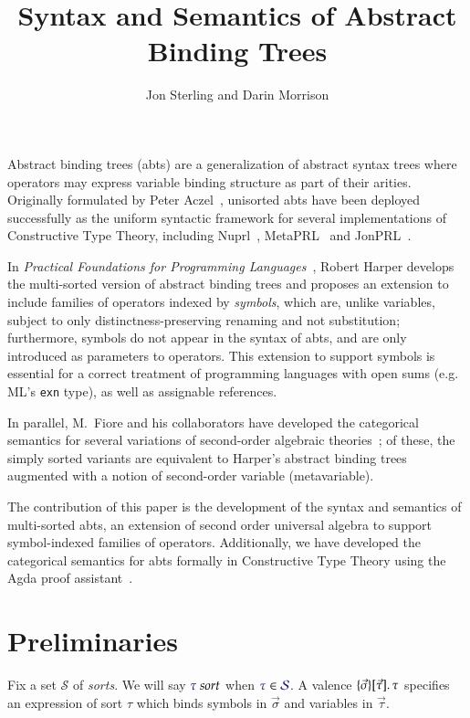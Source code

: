 \documentclass[11pt]{article}
\theoremstyle{definition}
\theoremstyle{remark}
\numberwithin{equation}{section}
\def\IModeColorName{MidnightBlue}
\newcommand\IMode[1]{{\color{\IModeColorName}{#1}}}
\newcommand\Member[2]{\IMode{#1}\in\IMode{#2}}
\newcommand\MkValence[3]{%
  \ifthenelse{\equal{#1}{}}{}{%
    \{#1\}%
  }%
  \ifthenelse{\equal{#2}{}}{}{%
    [#2]%
  }.\, #3%
}
\newcommand\IsSort[1]{\IMode{#1}\ \textit{sort}}
\newcommand\Sorts{\mathcal{S}}
\begin{document}
\title{Syntax and Semantics of Abstract Binding Trees}
\date{}
\author{Jon Sterling and Darin Morrison}
\maketitle

Abstract binding trees (abts) are a generalization of abstract syntax trees
where operators may express variable binding structure as part of their arities.
Originally formulated by Peter Aczel~\cite{aczel:1978}, unisorted abts have been
deployed successfully as the uniform syntactic framework for several
implementations of Constructive Type Theory, including
Nuprl~\cite{constable:1986}, MetaPRL~\cite{hickey:2003} and
JonPRL~\cite{jonprl:2015}.

In \emph{Practical Foundations for Programming Languages}~\cite{harper:2016},
Robert Harper develops the multi-sorted version of abstract binding trees and
proposes an extension to include families of operators indexed by
\emph{symbols}, which are, unlike variables, subject to only
distinctness-preserving renaming and not substitution; furthermore, symbols do
not appear in the syntax of abts, and are only introduced as parameters to
operators. This extension to support symbols is essential for a correct
treatment of programming languages with open sums (e.g. ML's \texttt{exn} type),
as well as assignable references.

In parallel, M.\ Fiore and his collaborators have developed the categorical
semantics for several variations of second-order algebraic
theories~\cite{fiore:1999, fiore:2005, fiore-hur:2010, fiore-mamoud:2010}; of
these, the simply sorted variants are equivalent to Harper's abstract binding
trees augmented with a notion of second-order variable (metavariable).

The contribution of this paper is the development of the syntax and semantics of
multi-sorted abts, an extension of second order universal algebra to support
symbol-indexed families of operators. Additionally, we have developed the
categorical semantics for abts formally in Constructive Type Theory using the
Agda proof assistant~\cite{norell:2007}.

\section{Preliminaries}

Fix a set $\Sorts$ of \emph{sorts}. We will say $\IsSort{\tau}$ when
$\Member{\tau}{\Sorts}$. A valence $\MkValence{\vec{\sigma}}{\vec{\tau}}{\tau}$
specifies an expression of sort $\tau$ which binds symbols in $\vec{\sigma}$ and
variables in $\vec{\tau}$.
\end{document}
